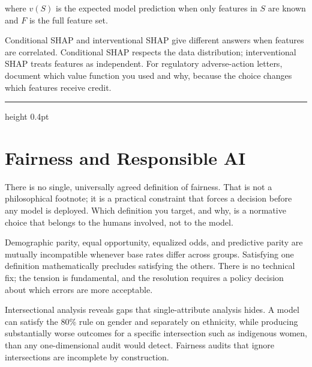 \documentclass[12pt,a4paper]{article}
\begin{document}
where $v(S)$ is the expected model prediction when only features in $S$
are known and $F$ is the full feature set.

\begin{mentalmodel}
Conditional SHAP and interventional SHAP give different answers when
features are correlated. Conditional SHAP respects the data distribution;
interventional SHAP treats features as independent. For regulatory
adverse-action letters, document which value function you used and why,
because the choice changes which features receive credit.
\end{mentalmodel}

\vspace{10pt}\hrule height 0.4pt\vspace{14pt}

\section*{Fairness and Responsible AI}

There is no single, universally agreed definition of fairness. That is not
a philosophical footnote; it is a practical constraint that forces a
decision before any model is deployed. Which definition you target, and why,
is a normative choice that belongs to the humans involved, not to the model.

\begin{concept}
Demographic parity, equal opportunity, equalized odds, and predictive
parity are mutually incompatible whenever base rates differ across groups.
Satisfying one definition mathematically precludes satisfying the others.
There is no technical fix; the tension is fundamental, and the resolution
requires a policy decision about which errors are more acceptable.
\end{concept}

\begin{analogy}
Intersectional analysis reveals gaps that single-attribute analysis hides.
A model can satisfy the 80\% rule on gender and separately on ethnicity,
while producing substantially worse outcomes for a specific intersection
such as indigenous women, than any one-dimensional audit would detect.
Fairness audits that ignore intersections are incomplete by construction.
\end{analogy}
\end{document}
